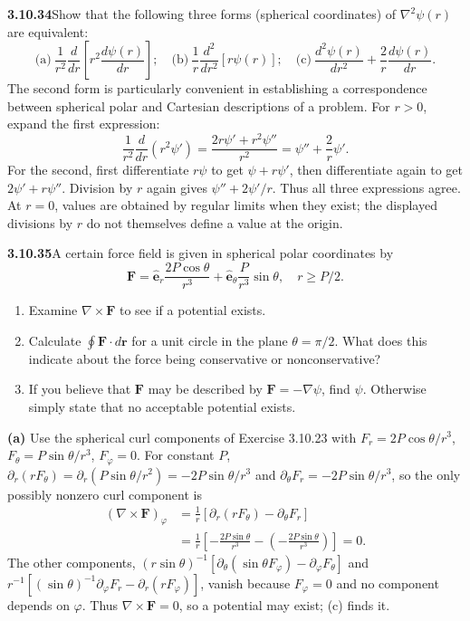 \par\bigskip
\noindent\textbf{3.10.34}\quad Show that the following three forms (spherical
coordinates) of $\nabla^{2}\psi(r)$ are equivalent:
\[
\text{(a)}\ \frac{1}{r^{2}}\frac{d}{dr}\left[r^{2}\frac{d\psi(r)}{dr}\right];
\quad
\text{(b)}\ \frac{1}{r}\frac{d^{2}}{dr^{2}}[r\psi(r)];
\quad
\text{(c)}\ \frac{d^{2}\psi(r)}{dr^{2}}+\frac{2}{r}\frac{d\psi(r)}{dr}.
\]
The second form is particularly convenient in establishing a correspondence
between spherical polar and Cartesian descriptions of a problem.
\solution
For $r>0$, expand the first expression:
\[
\frac1{r^2}\frac d{dr}(r^2\psi')
=\frac{2r\psi'+r^2\psi''}{r^2}
=\psi''+\frac2r\psi'.
\]
For the second, first differentiate $r\psi$ to get $\psi+r\psi'$,
then differentiate again to get $2\psi'+r\psi''$.
Division by $r$ again gives $\psi''+2\psi'/r$.
Thus all three expressions agree. At $r=0$, values are obtained by
regular limits when they exist; the displayed divisions by $r$ do
not themselves define a value at the origin.

\par\bigskip
\noindent\textbf{3.10.35}\quad A certain force field is given in spherical
polar coordinates by
\[
\mathbf{F}=\hat{\mathbf{e}}_{r}\frac{2P\cos\theta}{r^{3}}
+\hat{\mathbf{e}}_{\theta}\frac{P}{r^{3}}\sin\theta,\quad r\ge P/2.
\]
\begin{enumerate}
\item[(a)] Examine $\nabla\times\mathbf{F}$ to see if a potential exists.
\item[(b)] Calculate $\oint\mathbf{F}\cdot d\mathbf{r}$ for a unit circle in
  the plane $\theta=\pi/2$. What does this indicate about the force being
  conservative or nonconservative?
\item[(c)] If you believe that $\mathbf{F}$ may be described by
  $\mathbf{F}=-\nabla\psi$, find $\psi$. Otherwise simply state that no
  acceptable potential exists.
\end{enumerate}
\solution
\textbf{(a)} Use the spherical curl components of Exercise 3.10.23 with
$F_r=2P\cos\theta/r^3$, $F_\theta=P\sin\theta/r^3$, $F_\varphi=0$.
For constant $P$, $\partial_r(rF_\theta)=\partial_r(P\sin\theta/r^2)
=-2P\sin\theta/r^3$ and $\partial_\theta F_r=-2P\sin\theta/r^3$, so
the only possibly nonzero curl component is
\[
\begin{aligned}
(\nabla\times\mathbf F)_\varphi
&=\frac1r[\partial_r(rF_\theta)-\partial_\theta F_r]\\
&=\frac1r\left[-\frac{2P\sin\theta}{r^3}
-\left(-\frac{2P\sin\theta}{r^3}\right)\right]=0.
\end{aligned}
\]
The other components,
$(r\sin\theta)^{-1}[\partial_\theta(\sin\theta F_\varphi)-\partial_\varphi F_\theta]$
and $r^{-1}[(\sin\theta)^{-1}\partial_\varphi F_r-\partial_r(rF_\varphi)]$,
vanish because $F_\varphi=0$ and no component
depends on $\varphi$. Thus $\nabla\times\mathbf F=0$, so a potential
may exist; (c) finds it.

